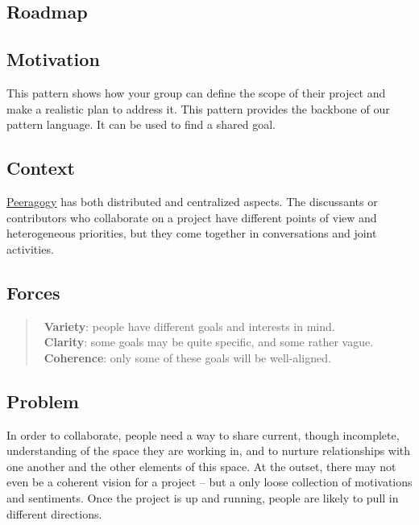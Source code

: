 \hypertarget{roadmap}{%
\subsection{Roadmap}\label{roadmap}}

\hypertarget{motivation}{%
\subsection{Motivation}\label{motivation}}

This pattern shows how your group can define the scope of their project
and make a realistic plan to address it. This pattern provides the
backbone of our pattern language. It can be used to find a shared goal.

\hypertarget{context}{%
\subsection{Context}\label{context}}

\href{http://peeragogy.github.io/pattern-peeragogy.html}{Peeragogy} has
both distributed and centralized aspects. The discussants or
contributors who collaborate on a project have different points of view
and heterogeneous priorities, but they come together in conversations
and joint activities.

\hypertarget{forces}{%
\subsection{Forces}\label{forces}}

\begin{quote}
\Svariety\ \textbf{Variety}: people have different goals and interests in mind.\\
\Sclarity\ \textbf{Clarity}: some goals may be quite specific, and some rather vague.\\
\Scoherence\ \textbf{Coherence}: only some of these goals will be well-aligned.
\end{quote}

\hypertarget{problem}{%
\subsection{Problem}\label{problem}}

In order to collaborate, people need a way to share current, though
incomplete, understanding of the space they are working in, and to
nurture relationships with one another and the other elements of this
space. At the outset, there may not even be a coherent vision for a
project -- but a only loose collection of motivations and sentiments.
Once the project is up and running, people are likely to pull in
different directions.

